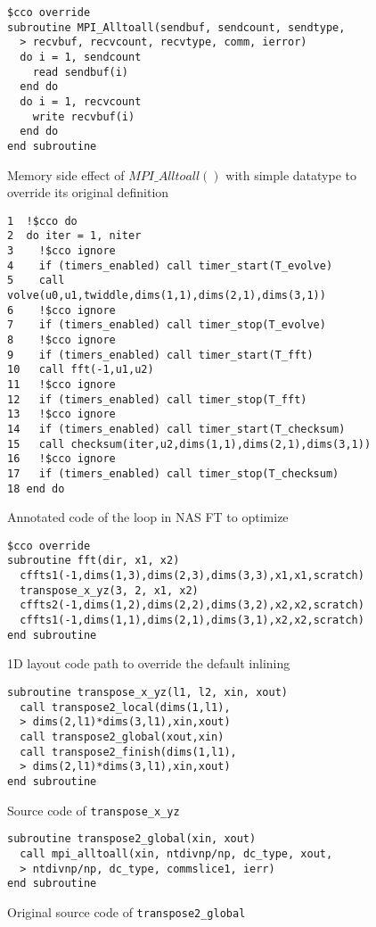 \begin{figure}[h]
{\scriptsize
\begin{verbatim}
$cco override
subroutine MPI_Alltoall(sendbuf, sendcount, sendtype,
  > recvbuf, recvcount, recvtype, comm, ierror)
  do i = 1, sendcount
    read sendbuf(i)
  end do
  do i = 1, recvcount
    write recvbuf(i)
  end do
end subroutine
\end{verbatim}
}
\caption{Memory side effect of $MPI\_Alltoall()$ with simple datatype to override its original definition}
\label{fig:annot:a2a}
\end{figure}

\begin{figure}[h]
{\scriptsize
\begin{verbatim}
1  !$cco do
2  do iter = 1, niter
3    !$cco ignore
4    if (timers_enabled) call timer_start(T_evolve)
5    call volve(u0,u1,twiddle,dims(1,1),dims(2,1),dims(3,1))
6    !$cco ignore
7    if (timers_enabled) call timer_stop(T_evolve)
8    !$cco ignore
9    if (timers_enabled) call timer_start(T_fft)
10   call fft(-1,u1,u2)
11   !$cco ignore
12   if (timers_enabled) call timer_stop(T_fft)
13   !$cco ignore
14   if (timers_enabled) call timer_start(T_checksum)
15   call checksum(iter,u2,dims(1,1),dims(2,1),dims(3,1))
16   !$cco ignore
17   if (timers_enabled) call timer_stop(T_checksum)
18 end do
\end{verbatim}
}
\caption{Annotated code of the loop in NAS FT to optimize}
\label{fig:code:ft}
\end{figure}

\begin{figure}[h]
{\scriptsize
\begin{verbatim}
$cco override
subroutine fft(dir, x1, x2)
  cffts1(-1,dims(1,3),dims(2,3),dims(3,3),x1,x1,scratch)
  transpose_x_yz(3, 2, x1, x2)
  cffts2(-1,dims(1,2),dims(2,2),dims(3,2),x2,x2,scratch)
  cffts1(-1,dims(1,1),dims(2,1),dims(3,1),x2,x2,scratch)
end subroutine
\end{verbatim}
}
\caption{1D layout code path to override the default inlining}
\label{fig:annot:ft}
\end{figure}

\begin{figure}[h]
{\scriptsize
\begin{verbatim}
subroutine transpose_x_yz(l1, l2, xin, xout)
  call transpose2_local(dims(1,l1),
  > dims(2,l1)*dims(3,l1),xin,xout)
  call transpose2_global(xout,xin)
  call transpose2_finish(dims(1,l1),
  > dims(2,l1)*dims(3,l1),xin,xout)
end subroutine
\end{verbatim}
}
\caption{Source code of \texttt{transpose\_x\_yz}}
\label{fig:code:transpose}
\end{figure}

\begin{figure}[h]
{\scriptsize
\begin{verbatim}
subroutine transpose2_global(xin, xout)
  call mpi_alltoall(xin, ntdivnp/np, dc_type, xout,
  > ntdivnp/np, dc_type, commslice1, ierr)
end subroutine
\end{verbatim}
}
\caption{Original source code of \texttt{transpose2\_global}}
\label{fig:code:transpose2}
\end{figure}

